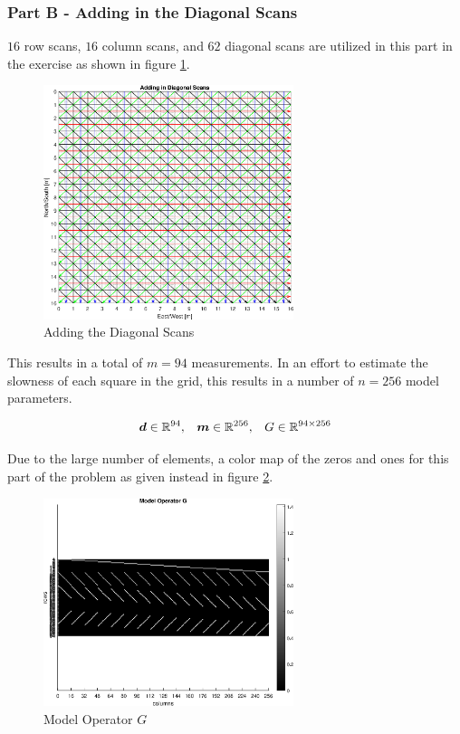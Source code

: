 \subsubsection{Part B - Adding in the Diagonal Scans}

$16$ row scans, $16$ column scans, and $62$ diagonal scans are utilized in this part in the exercise as shown in figure \ref{fig: prob2 part B row column scan viz}. 

\begin{figure}[h] 
	\centering
	\includegraphics[width=0.65\textwidth]{./images/prob2_partB_scans_vizualization.eps}
	\caption{Adding the Diagonal Scans}
	\label{fig: prob2 part B row column scan viz}
\end{figure}
\FloatBarrier

This results in a total of $m = 94$ measurements. In an effort to estimate the slowness of each square in the grid, this results in a number of $n = 256$ model parameters. 

\begin{align*}
	\boldsymbol{d} \in \mathbb{R}^{94},\,\,\,\,\,\boldsymbol{m} \in \mathbb{R}^{256},\,\,\,\,\,G \in \mathbb{R}^{94 \times 256}
\end{align*}

Due to the large number of elements, a color map of the zeros and ones for this part of the problem as given instead in figure \ref{fig: prob2 part B model operator G}.

\begin{figure}[h] 
	\centering
	\includegraphics[width=0.65\textwidth]{./images/prob2_partB_model_operator_G.eps}
	\caption{Model Operator $G$}
	\label{fig: prob2 part B model operator G}
\end{figure}
\FloatBarrier

